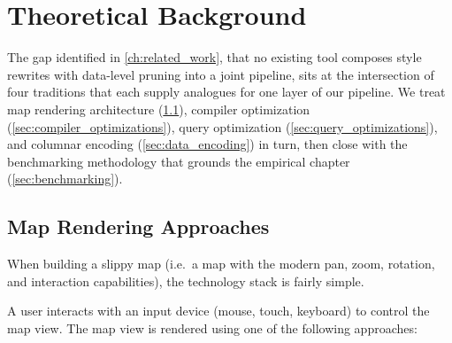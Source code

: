 \chapter{Theoretical Background}\label{ch:theoretical_background}

The gap identified in \cref{ch:related_work}, that no existing tool composes style rewrites with data-level pruning into a joint pipeline, sits at the intersection of four traditions that each supply analogues for one layer of our pipeline.
We treat map rendering architecture (\cref{sec:map_rendering_approaches}), compiler optimization (\cref{sec:compiler_optimizations}), query optimization (\cref{sec:query_optimizations}), and columnar encoding (\cref{sec:data_encoding}) in turn, then close with the benchmarking methodology that grounds the empirical chapter (\cref{sec:benchmarking}).

\section{Map Rendering Approaches}\label{sec:map_rendering_approaches}

When building a slippy map (i.e.\ a map with the modern pan, zoom, rotation, and interaction capabilities), the technology stack is fairly simple.

A user interacts with an input device (mouse, touch, keyboard) to control the map view.
The map view is rendered using one of the following approaches:

